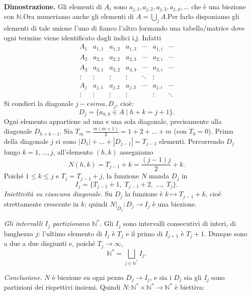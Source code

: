 \documentclass[11pt,a4paper]{article}
\theoremstyle{definition}
\theoremstyle{plain}
\theoremstyle{remark}
\begin{document}
\textbf{Dimostrazione.}
Gli elementi di $A_i$ sono $a_{j,1},a_{j,2},a_{j,3},a_{j,4},...$ che è una biezione con $\mathbb{N}$.Ora numeriamo anche gli elementi di $A = \bigcup_{j}{A}$.Per farlo disponiamo gli elementi di tale unione l'uno di fianco l'altro formando una tabella/matrice dove ogni termine viene identificato dagli indici i,j. Infatti
\[
\begin{array}{c|cccccc}
A_1 & a_{1,1} & a_{1,2} & a_{1,3} & \cdots & a_{1,i} & \cdots\\
A_2 & a_{2,1} & a_{2,2} & a_{2,3} & \cdots & a_{2,i} & \cdots\\
A_3 & a_{3,1} & a_{3,2} & a_{3,3} & \cdots & a_{3,i} & \cdots\\
\vdots & \vdots & \vdots & \vdots & \ddots & \vdots & \\
A_j & a_{j,1} & a_{j,2} & a_{j,3} & \cdots & a_{j,i} & \cdots\\
\vdots & \vdots & \vdots & \vdots &  & \vdots & \ddots
\end{array}
\]
Si condieri la diagonale $j-esima,D_j$, cioè:
\[
D_j=\{a_{h,k}\in A\mid h+k=j+1\}.
\]
Ogni elemento appartiene ad una e una sola diagonale, precisamente alla diagonale $D_{h+k-1}$. Sia $T_m=\frac{m(m+1)}{2}=1+2+\dots+m$ (con
$T_0=0$). Prima della diagonale $j$ ci sono $|D_1|+\dots+|D_{j-1}|=T_{j-1}$
elementi. Percorrendo $D_j$ lungo $k=1,\dots,j$, all'elemento $(h,k)$
assegniamo
\[
N(h,k)=T_{j-1}+k=\frac{(j-1)j}{2}+k .
\]
Poich\'e $1\le k\le j$ e $T_j=T_{j-1}+j$, la funzione $N$ manda $D_j$ in
\[
I_j=\{T_{j-1}+1,\;T_{j-1}+2,\;\dots,\;T_j\}.
\]
\emph{Iniettivit\`a su ciascuna diagonale.} Su $D_j$ la funzione \`e
$k\mapsto T_{j-1}+k$, cio\`e strettamente crescente in $k$; quindi $N|_{D_j}\colon D_j\to I_j$
\`e una biezione.

\emph{Gli intervalli $I_j$ partizionano $\mathbb{N}^*$.} Gli $I_j$ sono
intervalli consecutivi di interi, di lunghezza $j$:
l'ultimo elemento di $I_j$ \`e $T_j$ e il primo di $I_{j+1}$ \`e $T_j+1$.
Dunque sono a due a due disgiunti e, poich\'e $T_j\to\infty$,
\[
\mathbb{N}^*=\bigsqcup_{j\in\mathbb{N}^*}I_j .
\]

\emph{Conclusione.} $N$ \`e biezione su ogni pezzo $D_j\to I_j$, e sia i $D_j$
sia gli $I_j$ sono partizioni dei rispettivi insiemi. Quindi
$N\colon\mathbb{N}^*\times\mathbb{N}^*\to\mathbb{N}^*$ \`e biettiva:
\end{document}
